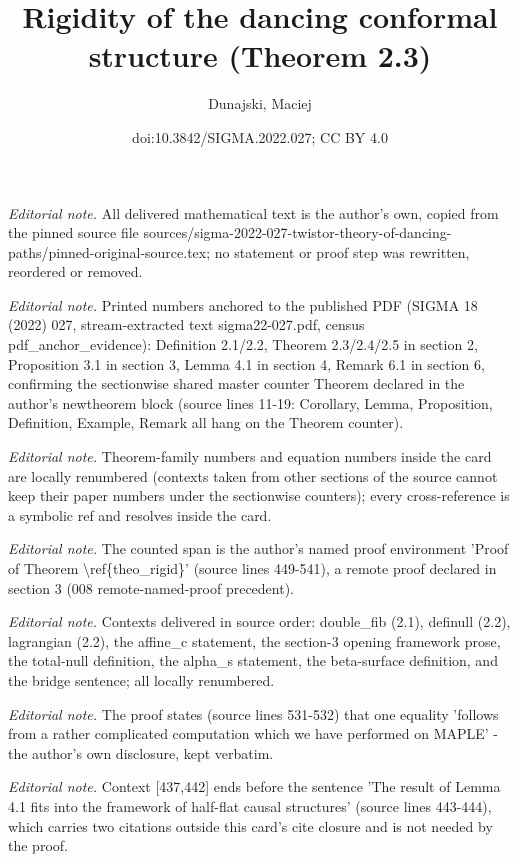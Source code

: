 \documentclass[10pt,a4paper]{article}
\title{Rigidity of the dancing conformal structure (Theorem 2.3)}
\author{Dunajski, Maciej}
\date{doi:10.3842/SIGMA.2022.027; CC BY 4.0}
\numberwithin{equation}{section}
\begin{document}
\maketitle
\setcounter{section}{2}
\setcounter{Theorem}{2}
\setcounter{equation}{0}
\noindent\textit{Editorial note.} All delivered mathematical text is the author's own, copied from the pinned source file sources/sigma-2022-027-twistor-theory-of-dancing-paths/pinned-original-source.tex; no statement or proof step was rewritten, reordered or removed.\par\medskip
\noindent\textit{Editorial note.} Printed numbers anchored to the published PDF (SIGMA 18 (2022) 027, stream-extracted text sigma22-027.pdf, census pdf\_anchor\_evidence): Definition 2.1/2.2, Theorem 2.3/2.4/2.5 in section 2, Proposition 3.1 in section 3, Lemma 4.1 in section 4, Remark 6.1 in section 6, confirming the sectionwise shared master counter Theorem declared in the author's newtheorem block (source lines 11-19: Corollary, Lemma, Proposition, Definition, Example, Remark all hang on the Theorem counter).\par\medskip
\noindent\textit{Editorial note.} Theorem-family numbers and equation numbers inside the card are locally renumbered (contexts taken from other sections of the source cannot keep their paper numbers under the sectionwise counters); every cross-reference is a symbolic ref and resolves inside the card.\par\medskip
\noindent\textit{Editorial note.} The counted span is the author's named proof environment 'Proof of Theorem \textbackslash{}ref\{theo\_rigid\}' (source lines 449-541), a remote proof declared in section 3 (008 remote-named-proof precedent).\par\medskip
\noindent\textit{Editorial note.} Contexts delivered in source order: double\_fib (2.1), definull (2.2), lagrangian (2.2), the affine\_c statement, the section-3 opening framework prose, the total-null definition, the alpha\_s statement, the beta-surface definition, and the bridge sentence; all locally renumbered.\par\medskip
\noindent\textit{Editorial note.} The proof states (source lines 531-532) that one equality 'follows from a rather complicated computation which we have performed on MAPLE' - the author's own disclosure, kept verbatim.\par\medskip
\noindent\textit{Editorial note.} Context [437,442] ends before the sentence 'The result of Lemma 4.1 fits into the framework of half-flat causal structures' (source lines 443-444), which carries two citations outside this card's cite closure and is not needed by the proof.\par\medskip
\end{document}
